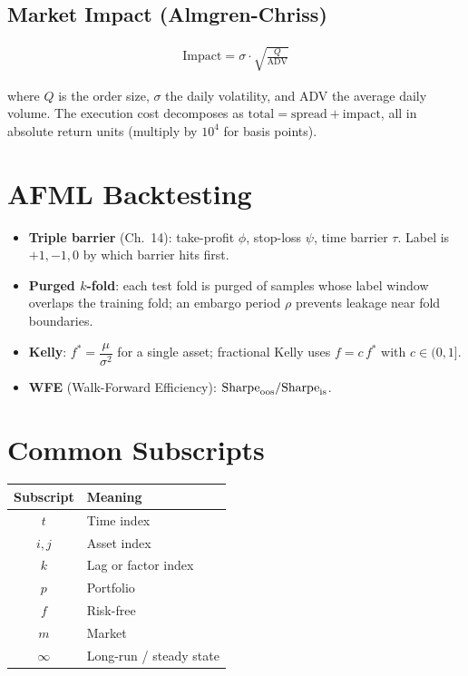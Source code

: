 \subsection{Market Impact (Almgren-Chriss)}

\begin{align}
\text{Impact} = \sigma \cdot \sqrt{\frac{Q}{\text{ADV}}}
\end{align}

where $Q$ is the order size, $\sigma$ the daily volatility, and ADV the
average daily volume. The execution cost decomposes as
$\text{total} = \text{spread} + \text{impact}$, all in absolute return
units (multiply by $10^4$ for basis points).

\section{AFML Backtesting}

\begin{itemize}
    \item \textbf{Triple barrier} (Ch.~14): take-profit $\phi$, stop-loss
      $\psi$, time barrier $\tau$. Label is $+1, -1, 0$ by which barrier
      hits first.
    \item \textbf{Purged $k$-fold}: each test fold is purged of samples
      whose label window overlaps the training fold; an embargo period
      $\rho$ prevents leakage near fold boundaries.
    \item \textbf{Kelly}: $f^* = \dfrac{\mu}{\sigma^2}$ for a single asset;
      fractional Kelly uses $f = c \, f^*$ with $c \in (0, 1]$.
    \item \textbf{WFE} (Walk-Forward Efficiency):
      $\text{Sharpe}_{\text{oos}} / \text{Sharpe}_{\text{is}}$.
\end{itemize}

\section{Common Subscripts}

\begin{center}
\begin{tabular}{cl}
\toprule
\textbf{Subscript} & \textbf{Meaning} \\
\midrule
$t$ & Time index \\
$i, j$ & Asset index \\
$k$ & Lag or factor index \\
$p$ & Portfolio \\
$f$ & Risk-free \\
$m$ & Market \\
$\infty$ & Long-run / steady state \\
\bottomrule
\end{tabular}
\end{center}